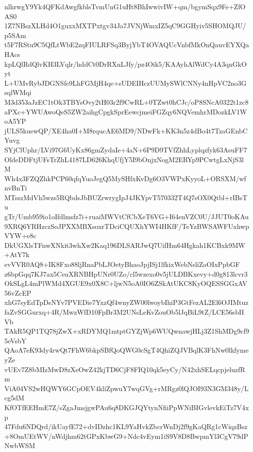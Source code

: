 nlhrwgY9Yk4QFKdAwgfkblsTvmUnG1uHt8BhIwwivIW+qm/bgymSqx9Fe+ZfOAS0
1Z7NBszXLHd4O1guxxMXTPxtgv34Ja7JVNjWmxIZ5qC9GGHyiv5SHOMQJU/p5SAm
t5F7RStu9C5QfLtWbE2zqFIULRFSq3ByjYbT4OVAQUcVnbfMkOnQauvEYXQaHAcs
kpLQlRdQlvKH3LVqlr/hddCt0DrRXnLJfy/pz4Oik5/KAAyhAlWdCy4A3qnGkOyt
L+UMvRybJDGNSfe9LhFGMjH4qe+sUDEIHczUUMySWlCNNy4nHpVC2no3GsqlWMqi
M3d353aJzEC1tOk3TBYsOvy2tH03r2f9CwRL+0TZwt0hCJc/oP8SNcA0322t1zc8
aPXc+YWUAwoQeS5ZW2aihgCpgkSprEewcjmeiFGZqy6NQVemhrMDozkLV1WoA5YP
jULS5kuewQP/XE4ha0I+M8rqucAE6MD9/NDwFk+KK3n5z4dBo4t7TzaGEnbCYuvg
SYjClUphr/LVi97G6UyKx86gmZydaIe+4aN+6P9D9TVfZhhLyplqzfyk63AsuFF7
OldeDDFtjUFsTrZhL4187LD626KhqUfjY5I9bOnjxNogM2ERYp9PCwtgLxNjS3lM
Wh4x3FZQZhkPCP60qfqYuoJegQ5MySHfxKvDg6O3VWPxKyyoL+ORSXM/wfnvBnTi
MTsszMdVh5wzs5RQbdsJbBUZrwrygIpJ4JKYpvT570332T4Q7sOX0Qtbl+rIBsTu
gTr/Umb959io1oIfdlmsfz7i+ruaiMWVtCfCbXeT6VG+I64enVZC0U/JJUT0oKAu
9XRQ6YRHzczSoJPXXMBXsoxrTDciCQUXhYWI4HKfF/TeYzBWSAWFUxhwpVYW+e8c
DkUGXlsTFnwXNkit3whXw2Kaq196DLSARJwQ7UifHm64Hgkah1KCBxk9MW+AtY7k
evVVR0AQ8+IK8Fxo88ljRnaPbLJOetyBhaoJpjISj1lfkixWebNsliZaOIxPpbGF
z6bpGqq7KJ7ax5CeuXRNBHpUNr0UZo/cl5wzexo0v5jULDBKxevy+d0g813lcvr3
OkSLgL4mPlWMd4XGUE9x0X8C+ljwN5oA0IO6ZSkAtUKC8KyOQESSGGxAV56vZcEP
xhG7syEdTpDsNYv7PVEDie7YxzQf4wnyZW00lwoybIhiP3GtFezAL2El6OJIMtuz
faZvSGGurxq+4R/MwzWfD10FpBr3M2UNsLeKvZouOb5lJqBiL9tZ/LCE56sbIIVb
TAkR5QP1TQ78jZwX+xRDYMQ1mtptGYZjWp6WUQwnawjHLj3Z1ShMDg9cf95eVsbY
QAoA7eK93dy4rwQt7FhW6bkpSBfQoQWG0cSgT4QhiZQJVBqlK3FhNw0lkfymeyZe
vUEv7Z8bMIzMwD8zXeOwZ42kjTD6CjF8FIQ10qk5eyCy/N42xhSELqcpjeluzfRm
ViA04VS2wHQWY6GCpOEV4kliZpwuY7wqGVg+rMRgz0lQJOI93N3GM348y/Lcg5dM
KfOTfEEHmE7Z/sZgaJmsjgwPAu6q8DKGJQYtynNfiiPpWNiBIGvlevkEiTz7V4xp
47Fdu6NDQrd/ikUayfE72+dvIDzhc1KL9YaHvkZbcrWnDj2f9gKaQRg1cWiqzBsz
+8OmUEtWV/nWdjhm62tGPxKbwG9+Ndc4vEym1iS9V8D8BwpmYl3CgV79dPNwbWSM
